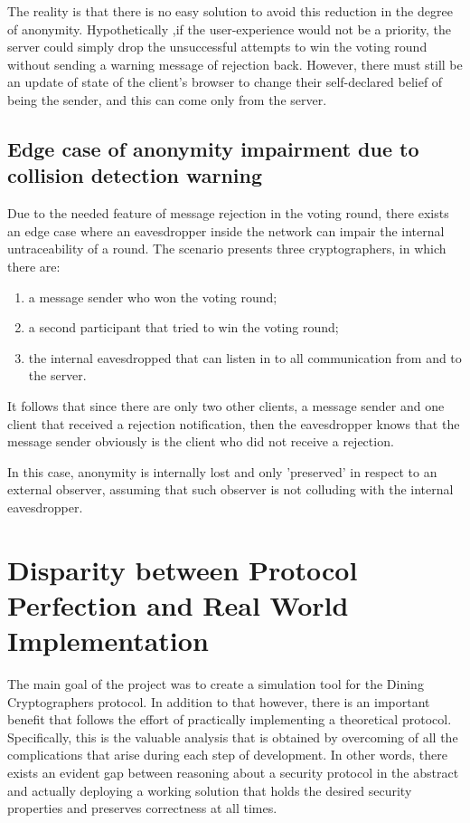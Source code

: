 The reality is that there is no easy solution to avoid this reduction in the degree of anonymity. Hypothetically ,if the user-experience would not be a priority, the server could simply drop the unsuccessful attempts to win the voting round without sending a warning message of rejection back. However, there must still be an update of state of the client's browser to change their self-declared belief of being the sender, and this can come only from the server.

\subsection{Edge case of anonymity impairment due to collision detection warning} \label{sec:anonymityImpairmentEdgeCase}
Due to the needed feature of message rejection in the voting round, there exists an edge case where an eavesdropper inside the network can impair the internal untraceability of a round. The scenario presents three cryptographers, in which there are:
\begin{enumerate}
    \item a message sender who won the voting round;
    \item a second participant that tried to win the voting round;
    \item the internal eavesdropped that can listen in to all communication from and to the server.
\end{enumerate}
It follows that since there are only two other clients, a message sender and one client that received a rejection notification, then the eavesdropper knows that the message sender obviously is the client who did not receive a rejection.

In this case, anonymity is internally lost and only 'preserved' in respect to an external observer, assuming that such observer is not colluding with the internal eavesdropper.


\section{Disparity between Protocol Perfection and Real World Implementation}
The main goal of the project was to create a simulation tool for the Dining Cryptographers protocol. In addition to that however, there is an important benefit that follows the effort of practically implementing a theoretical protocol. Specifically, this is the valuable analysis that is obtained by overcoming of all the complications that arise during each step of development. In other words, there exists an evident gap between reasoning about a security protocol in the abstract and actually deploying a working solution that holds the desired security properties and preserves correctness at all times.

